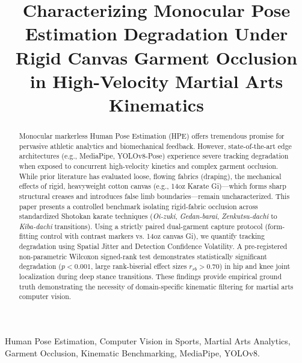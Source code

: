 \documentclass[conference]{IEEEtran}
\begin{document}
\title{Characterizing Monocular Pose Estimation Degradation Under Rigid Canvas Garment Occlusion in High-Velocity Martial Arts Kinematics}

\author{
}

\maketitle

\begin{abstract}
Monocular markerless Human Pose Estimation (HPE) offers tremendous promise for pervasive athletic analytics and biomechanical feedback. However, state-of-the-art edge architectures (e.g., MediaPipe, YOLOv8-Pose) experience severe tracking degradation when exposed to concurrent high-velocity kinetics and complex garment occlusion. While prior literature has evaluated loose, flowing fabrics (draping), the mechanical effects of rigid, heavyweight cotton canvas (e.g., 14oz Karate Gi)—which forms sharp structural creases and introduces false limb boundaries—remain uncharacterized. This paper presents a controlled benchmark isolating rigid-fabric occlusion across standardized Shotokan karate techniques (\textit{Oi-zuki}, \textit{Gedan-barai}, \textit{Zenkutsu-dachi} to \textit{Kiba-dachi} transitions). Using a strictly paired dual-garment capture protocol (form-fitting control with contrast markers vs. 14oz canvas Gi), we quantify tracking degradation using Spatial Jitter and Detection Confidence Volatility. A pre-registered non-parametric Wilcoxon signed-rank test demonstrates statistically significant degradation ($p < 0.001$, large rank-biserial effect sizes $r_{rb} > 0.70$) in hip and knee joint localization during deep stance transitions. These findings provide empirical ground truth demonstrating the necessity of domain-specific kinematic filtering for martial arts computer vision.
\end{abstract}

\begin{IEEEkeywords}
Human Pose Estimation, Computer Vision in Sports, Martial Arts Analytics, Garment Occlusion, Kinematic Benchmarking, MediaPipe, YOLOv8.
\end{IEEEkeywords}








\end{document}
